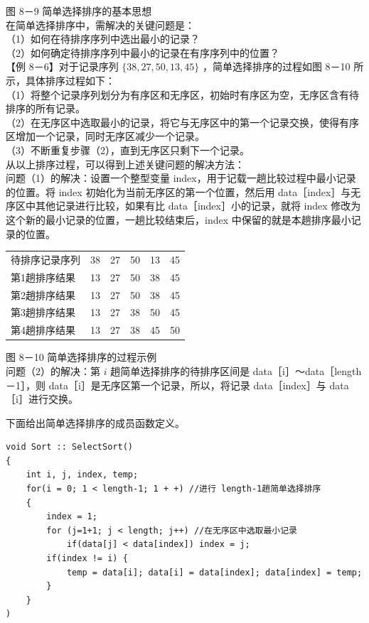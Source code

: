 \documentclass[10pt]{article}
\begin{document}
图 8－9 简单选择排序的基本思想\\
在简单选择排序中，需解决的关键问题是：\\
（1）如何在待排序序列中选出最小的记录？\\
（2）如何确定待排序序列中最小的记录在有序序列中的位置？\\
【例 8－6】对于记录序列 $\{38,27,50,13,45\}$ ，简单选择排序的过程如图 8－10 所示，具体排序过程如下：\\
（1）将整个记录序列划分为有序区和无序区，初始时有序区为空，无序区含有待排序的所有记录。\\
（2）在无序区中选取最小的记录，将它与无序区中的第一个记录交换，使得有序区增加一个记录，同时无序区减少一个记录。\\
（3）不断重复步骤（2），直到无序区只剩下一个记录。\\
从以上排序过程，可以得到上述关键问题的解决方法：\\
问题（1）的解决：设置一个整型变量 index，用于记载一趟比较过程中最小记录的位置。将 index 初始化为当前无序区的第一个位置，然后用 data［index］与无序区中其他记录进行比较，如果有比 data［index］小的记录，就将 index 修改为这个新的最小记录的位置，一趟比较结束后，index 中保留的就是本趟排序最小记录的位置。

\begin{center}
\begin{tabular}{llllll}
待排序记录序列 & 38 & 27 & 50 & 13 & 45 \\
第1趟排序结果 & 13 & 27 & 50 & 38 & 45 \\
第2趙排序结果 & 13 & 27 & 50 & 38 & 45 \\
第3趟排序结果 & 13 & 27 & 38 & 50 & 45 \\
第4趟排序结果 & 13 & 27 & 38 & 45 & 50 \\
\end{tabular}
\end{center}

图 8－10 简单选择排序的过程示例\\
问题（2）的解决：第 $i$ 趟简单选择排序的待排序区间是 data［i］～data［length－1］，则 data［i］是无序区第一个记录，所以，将记录 data［index］与 data［i］进行交换。

下面给出简单选择排序的成员函数定义。

\begin{verbatim}
void Sort :: SelectSort()
{
    int i, j, index, temp;
    for(i = 0; 1 < length-1; 1 + +) //进行 length-1趟简单选择排序
    {
        index = 1;
        for (j=1+1; j < length; j++) //在无序区中选取最小记录
            if(data[j] < data[index]) index = j;
        if(index != i) {
            temp = data[i]; data[i] = data[index]; data[index] = temp;
        }
    }
)
\end{verbatim}
\end{document}
